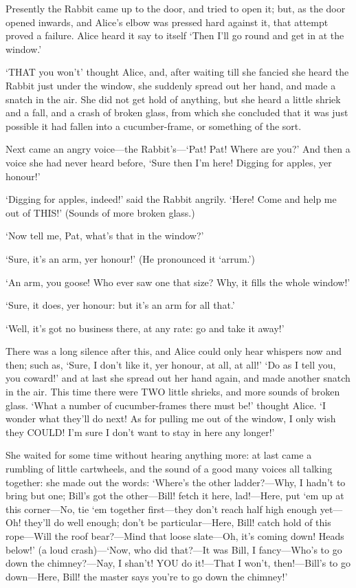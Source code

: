 \documentclass[12pt]{book}
\begin{document}
\begin{Parallel}[p]{}{}
{Presently the Rabbit came up to the door, and tried to open it; but, as the door opened inwards, and Alice’s elbow was pressed hard against it, that attempt proved a failure. Alice heard it say to itself ‘Then I’ll go round and get in at the window.’

‘THAT you won’t’ thought Alice, and, after waiting till she fancied she heard the Rabbit just under the window, she suddenly spread out her hand, and made a snatch in the air. She did not get hold of anything, but she heard a little shriek and a fall, and a crash of broken glass, from which she concluded that it was just possible it had fallen into a cucumber-frame, or something of the sort.

Next came an angry voice—the Rabbit’s—‘Pat! Pat! Where are you?’ And then a voice she had never heard before, ‘Sure then I’m here! Digging for apples, yer honour!’

‘Digging for apples, indeed!’ said the Rabbit angrily. ‘Here! Come and help me out of THIS!’ (Sounds of more broken glass.)

‘Now tell me, Pat, what’s that in the window?’

‘Sure, it’s an arm, yer honour!’ (He pronounced it ‘arrum.’)

‘An arm, you goose! Who ever saw one that size? Why, it fills the whole window!’

‘Sure, it does, yer honour: but it’s an arm for all that.’

‘Well, it’s got no business there, at any rate: go and take it away!’

There was a long silence after this, and Alice could only hear whispers now and then; such as, ‘Sure, I don’t like it, yer honour, at all, at all!’ ‘Do as I tell you, you coward!’ and at last she spread out her hand again, and made another snatch in the air. This time there were TWO little shrieks, and more sounds of broken glass. ‘What a number of cucumber-frames there must be!’ thought Alice. ‘I wonder what they’ll do next! As for pulling me out of the window, I only wish they COULD! I’m sure I don’t want to stay in here any longer!’

She waited for some time without hearing anything more: at last came a rumbling of little cartwheels, and the sound of a good many voices all talking together: she made out the words: ‘Where’s the other ladder?—Why, I hadn’t to bring but one; Bill’s got the other—Bill! fetch it here, lad!—Here, put ‘em up at this corner—No, tie ‘em together first—they don’t reach half high enough yet—Oh! they’ll do well enough; don’t be particular—Here, Bill! catch hold of this rope—Will the roof bear?—Mind that loose slate—Oh, it’s coming down! Heads below!’ (a loud crash)—‘Now, who did that?—It was Bill, I fancy—Who’s to go down the chimney?—Nay, I shan’t! YOU do it!—That I won’t, then!—Bill’s to go down—Here, Bill! the master says you’re to go down the chimney!’

}
\end{Parallel}
\end{document}
